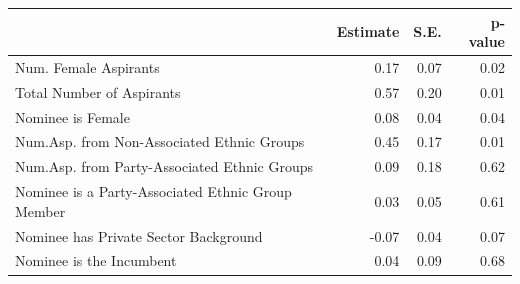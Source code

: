 \begin{table}[ht]
\centering
\label{tab:results.dd.cov}
\begin{tabular}{lrrr}
  \hline
 & Estimate & S.E. & p-value \\ 
  \hline
Num. Female Aspirants & 0.17 & 0.07 & 0.02 \\ 
  Total Number of Aspirants & 0.57 & 0.20 & 0.01 \\ 
  Nominee is Female & 0.08 & 0.04 & 0.04 \\ 
  Num.Asp. from Non-Associated Ethnic Groups & 0.45 & 0.17 & 0.01 \\ 
  Num.Asp. from Party-Associated Ethnic Groups & 0.09 & 0.18 & 0.62 \\ 
  Nominee is a Party-Associated Ethnic Group Member & 0.03 & 0.05 & 0.61 \\ 
  Nominee has Private Sector Background & -0.07 & 0.04 & 0.07 \\ 
  Nominee is the Incumbent & 0.04 & 0.09 & 0.68 \\ 
   \hline
\end{tabular}
\end{table}
